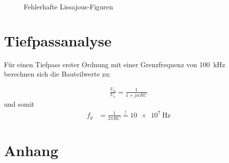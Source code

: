 \documentclass[
    paper=a4,
    fontsize=10pt,
    DIV=calc,
    twocolumn,
    oneside,
]{scrartcl}
\begin{document}
        \begin{figure}[hbt]
            \centering
            
            \caption{Fehlerhafte Lissajous-Figuren}
            \label{fig:a1-2}
        \end{figure}

\section{Tiefpassanalyse}
    Für einen Tiefpass erster Ordnung mit einer Grenzfrequenz von \SI{100}{\kilo\hertz} berechnen sich die Bauteilwerte zu:

    \begin{align}
        \frac{U_a}{U_e} = \frac{1}{1+jwRC}
    \end{align}
    und somit 
    \begin{align}
        f_g &= \frac{1}{2 \pi RC} \overset{!}{=} \SI{10e7}{\hertz}
    \end{align}





\printbibliography[heading=bibnumbered]


\appendix
\section{Anhang}

    

    
\end{document}
